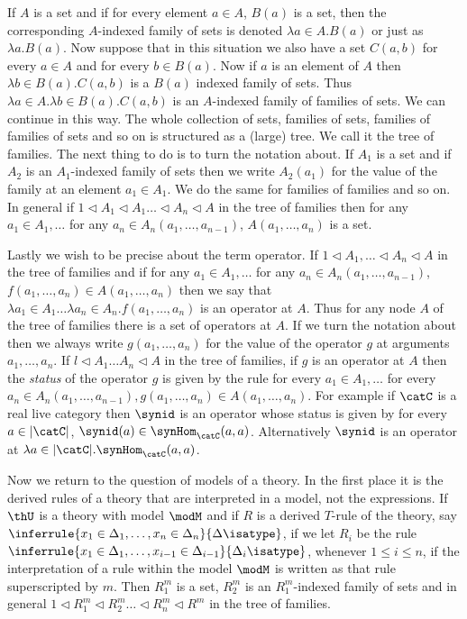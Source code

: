 If $A$ is a set and if for every element $a\in A$, $B(a)$ is a set, then the corresponding $A$-indexed family of sets is denoted $\lambda a\in A.B(a)$ or just as $\lambda a . B(a)$.
%
Now suppose that in this situation we also have a set $C(a,b)$ for every $a\in A$ and for every $b\in B(a)$.
%
Now if $a$ is an element of $A$ then $\lambda b\in B(a).C(a,b)$ is a $B(a)$ indexed family of sets.
%
Thus $\lambda a\in A.\lambda b\in B(a). C(a,b)$ is an $A$-indexed family of families of sets.
%
We can continue in this way.
%
The whole collection of sets, families of sets, families of families of sets and so on is structured as a (large) tree.
%
We call it the tree of families.
%
The next thing to do is to turn the notation about.
%
If $A_1$ is a set and if $A_2$ is an $A_1$-indexed family of sets then we write $A_2(a_1)$ for the value of the family at an element $a_1\in A_1$.
%
We do the same for families of families and so on.
%
In general if $1\triangleleft A_1\triangleleft A_1\ldots\triangleleft A_n\triangleleft A$ in the tree of families then for any $a_1\in A_1,\ldots$ for any $a_n\in A_n(a_1,\ldots,a_{n-1})$, $A(a_1,\ldots,a_n)$ is a set.

Lastly we wish to be precise about the term operator.
%
If $1\triangleleft A_1,\ldots\triangleleft A_n\triangleleft A$ in the tree of families and if for any $a_1\in A_1,\ldots$ for any $a_n\in A_n(a_1,\ldots,a_{n-1})$, $f(a_1,\ldots,a_n)\in A(a_1,\ldots,a_n)$ then we say that $\lambda a_1\in A_1\ldots\lambda a_n\in A_n.f(a_1,\ldots,a_n)$ is an operator at $A$.
%
Thus for any node $A$ of the tree of families there is a set of operators at $A$.
%
If we turn the notation about then we always write $g(a_1,\ldots,a_n)$ for the value of the operator $g$ at arguments $a_1,\ldots,a_n$. If $l\triangleleft A_1\ldots A_n\triangleleft A$ in the tree of families, if $g$ is an operator at $A$ then the \emph{status} of the operator $g$ is given by the rule for every $a_1\in A_1,\ldots$ for every $a_n\in A_n(a_1,\ldots,a_{n-1}), g(a_1,\ldots, a_n)\in A(a_1,\ldots,a_n)$.
%
For example if $\catC$ is a real live category then $\synid$ is an operator whose status is given by for every $a\in |\catC|$, $\synid(a)\in\synHom_{\catC}(a,a)$.
%
Alternatively $\synid$ is an operator at $\lambda a\in |\catC|.\synHom_{\catC}(a,a)$.

Now we return to the question of models of a theory.
%
In the first place it is the derived rules of a theory that are interpreted in a model, not the expressions.
%
If $\thU$ is a theory with model $\modM$ and if $R$ is a derived $T$-rule of the theory, say $\inferrule{x_1\in\Delta_1,\ldots,x_n\in\Delta_n}{\Delta\isatype}$, if we let $R_i$ be the rule $\inferrule{x_1\in\Delta_1,\ldots,x_{i-1}\in\Delta_{i-1}}{\Delta_i\isatype}$, whenever $1\leq i\leq n$, if the interpretation of a rule within the model $\modM$ is written as that rule superscripted by $m$.
%
Then $R_1^m$ is a set, $R_2^m$ is an $R_1^m$-indexed family of sets and in general $1\triangleleft R_1^m\triangleleft R_2^m\ldots\triangleleft R_n^m\triangleleft R^m$ in the tree of families.

